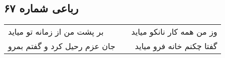 \begin{center}
\section*{رباعی شماره ۶۷}
\label{sec:sh067}
\begin{longtable}{l p{0.5cm} r}
بر پشت من از زمانه تو میاید
&&
وز من همه کار نانکو میاید
\\
جان عزم رحیل کرد و گفتم بمرو
&&
گفتا چکنم خانه فرو میاید
\\
\end{longtable}
\end{center}
